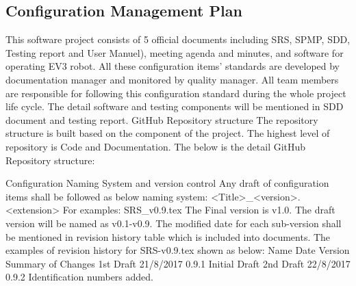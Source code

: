\subsection{Configuration Management Plan}
This software project consists of 5 official documents including SRS, SPMP, SDD, Testing report and User Manuel), meeting agenda and minutes, and software for operating EV3 robot. All these configuration items’ standards are developed by documentation manager and monitored by quality manager. All team members are responsible for following this configuration standard during the whole project life cycle. The detail software and testing components will be mentioned in SDD document and testing report.
GitHub Repository structure
The repository structure is built based on the component of the project. The highest level of repository is Code and Documentation. The below is the detail GitHub Repository structure:

Configuration Naming System and version control
Any draft of configuration items shall be followed as below naming system:
<Title>_<version>.<extension>
For examples: SRS_v0.9.tex
The Final version is v1.0. The draft version will be named as v0.1-v0.9.
The modified date for each sub-version shall be mentioned in revision history table which is included into documents.
The examples of revision history for SRS-v0.9.tex shown as below:
Name	Date	Version	Summary of Changes
1st Draft	21/8/2017	0.9.1	Initial Draft
2nd Draft	22/8/2017	0.9.2	Identification numbers
added.


